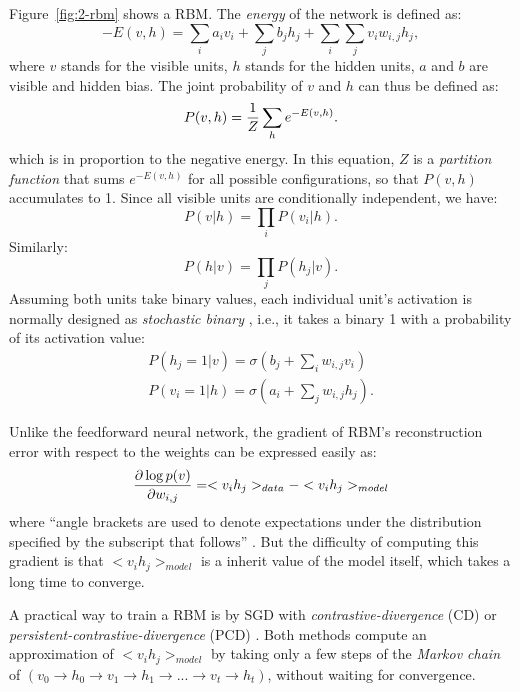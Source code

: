 Figure~\ref{fig:2-rbm} shows a RBM. The {\it energy} of the network is defined as:
\begin{equation}
-E(v,h) = \sum_i a_iv_i + \sum_j b_jh_j + \sum_i\sum_j v_iw_{i,j}h_j,
\end{equation}
where $v$ stands for the visible units, $h$ stands for the hidden units, $a$ and $b$ are visible and hidden bias. The joint probability of $v$ and $h$ can thus be defined as:
\begin{equation}
P(v,h) = {1\over Z} \sum_h e^{-E(v,h)}.
\end{equation}
which is in proportion to the negative energy. In this equation, $Z$ is a {\it partition function} that sums $e^{-E(v,h)}$ for all possible configurations, so that $P(v,h)$ accumulates to 1. Since all visible units are conditionally independent, we have:
\begin{equation}
P(v|h) = \prod_i P(v_i|h).
\end{equation}
Similarly:
\begin{equation}
P(h|v) = \prod_j P(h_j|v).
\end{equation}
Assuming both units take binary values, each individual unit's activation is normally designed as {\it stochastic binary} \cite{hinton2010practical}, i.e., it takes a binary 1 with a probability of its activation value:
\begin{equation}
\begin{split}
P(h_j=1|v) = \sigma(b_j+\sum_i w_{i,j}v_i) \\
P(v_i=1|h) = \sigma(a_i+\sum_j w_{i,j}h_j).
\end{split}
\end{equation}

Unlike the feedforward neural network, the gradient of RBM's reconstruction error with respect to the weights can be expressed easily as:
\begin{equation}
{\partial \log p(v) \over \partial w_{i,j}} = <v_ih_j>_{data} - <v_ih_j>_{model}
\end{equation}
where ``angle brackets are used to denote expectations under the distribution specified by the subscript that follows'' \cite{hinton2010practical}. But the difficulty of computing this gradient is that $<v_ih_j>_{model}$ is a inherit value of the model itself, which takes a long time to converge.

A practical way to train a RBM is by SGD with {\it contrastive-divergence} \cite{hinton2010practical} (CD) or {\it persistent-contrastive-divergence} (PCD) \cite{tieleman2008training}. Both methods compute an approximation of $<v_ih_j>_{model}$ by taking only a few steps of the {\it Markov chain} of $(v_0\rightarrow h_0\rightarrow v_1\rightarrow h_1\rightarrow...\rightarrow v_t\rightarrow h_t)$, without waiting for convergence.

